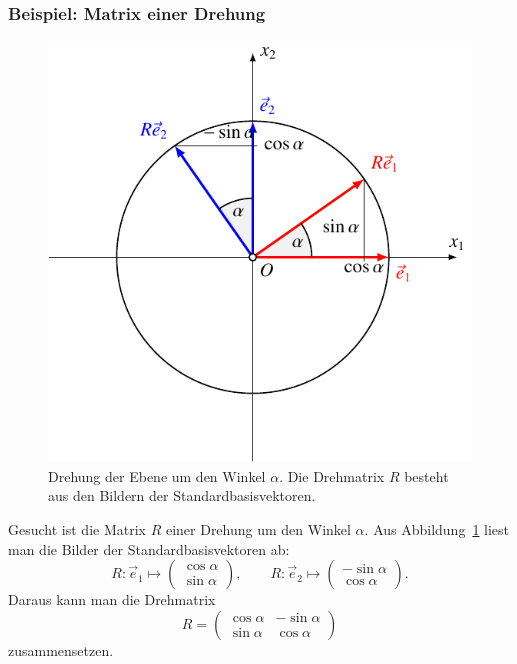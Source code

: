 \subsubsection{Beispiel: Matrix einer Drehung}
\begin{figure}
\centering
\includegraphics{3/images/drehung.pdf}
\caption{Drehung der Ebene um den Winkel $\alpha$.
Die Drehmatrix $R$ besteht aus den Bildern der Standardbasisvektoren.
\label{skript:affin:drehung}}
\end{figure}
Gesucht ist die Matrix $R$ einer Drehung um den Winkel $\alpha$.
Aus Abbildung~\ref{skript:affin:drehung} liest man die Bilder der
Standardbasisvektoren ab:
\[
R\colon \vec{e}_1 \mapsto \begin{pmatrix}\cos\alpha\\\sin\alpha\end{pmatrix},
\qquad
R\colon \vec{e}_2 \mapsto \begin{pmatrix}-\sin\alpha\\\cos\alpha\end{pmatrix}.
\]
Daraus kann man die Drehmatrix
\[
R=\begin{pmatrix}\cos\alpha&-\sin\alpha\\\sin\alpha&\cos\alpha\end{pmatrix}
\]
zusammensetzen.

%
%
